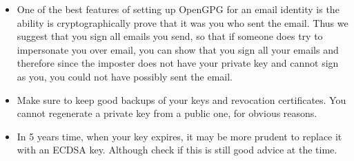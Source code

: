 \begin{itemize}
    \item One of the best features of setting up OpenGPG for an email identity is the ability is cryptographically prove that it was you who sent the email. Thus we suggest that you sign all emails you send, so that if someone does try to impersonate you over email, you can show that you sign all your emails and therefore since the imposter does not have your private key and cannot sign as you, you could not have possibly sent the email.
    \item Make sure to keep good backups of your keys and revocation certificates. You cannot regenerate a private key from a public one, for obvious reasons.
    \item In 5 years time, when your key expires, it may be more prudent to replace it with an ECDSA key. Although check if this is still good advice at the time.
\end{itemize}




